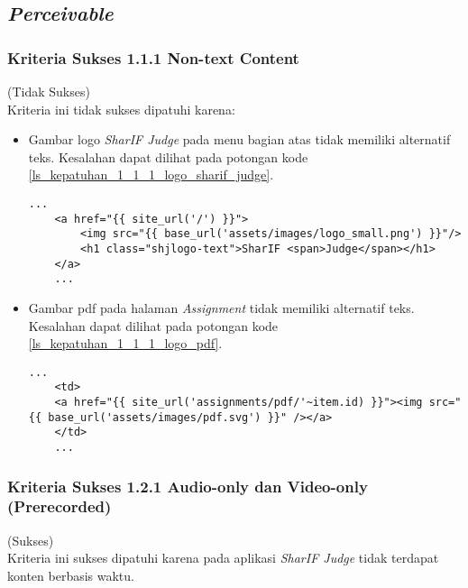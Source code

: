\subsection{\textit{Perceivable}}
\label{subsec:kepatuhan_perceivable}

\subsubsection{Kriteria Sukses 1.1.1 Non-text Content}
\label{subsubsec:kepatuhan_kriteria_1.1.1}
(Tidak Sukses) \\

Kriteria ini tidak sukses dipatuhi karena:
\begin{itemize}
	\item Gambar logo \textit{SharIF Judge} pada menu bagian atas tidak memiliki alternatif teks. Kesalahan dapat dilihat pada potongan kode \ref{ls_kepatuhan_1_1_1_logo_sharif_judge}.
	\begin{lstlisting}[basicstyle=\ttfamily, frame=single,
	columns=fullflexible, keepspaces=true, breaklines=true, label=ls_kepatuhan_1_1_1_logo_sharif_judge, caption=Kriteria Sukses 1.1.1 - Logo SharIF Judge Tidak Diberi Alternatif Teks]
	...
	<a href="{{ site_url('/') }}">
		<img src="{{ base_url('assets/images/logo_small.png') }}"/>
		<h1 class="shjlogo-text">SharIF <span>Judge</span></h1>
	</a>
	...
	\end{lstlisting}
	\item Gambar pdf pada halaman \textit{Assignment} tidak memiliki alternatif teks. Kesalahan dapat dilihat pada potongan kode \ref{ls_kepatuhan_1_1_1_logo_pdf}.
	\begin{lstlisting}[basicstyle=\ttfamily, frame=single,
	columns=fullflexible, keepspaces=true, breaklines=true, label=ls_kepatuhan_1_1_1_logo_pdf, caption=Kriteria Sukses 1.1.1 - Gambar PDF Tidak Diberi Alternatif Teks]
	...
	<td>
	<a href="{{ site_url('assignments/pdf/'~item.id) }}"><img src="{{ base_url('assets/images/pdf.svg') }}" /></a>
	</td>
	...
	\end{lstlisting}
\end{itemize}

\subsubsection{Kriteria Sukses 1.2.1 Audio-only dan Video-only (Prerecorded)}
\label{subsubsec:kepatuhan_kriteria_1.2.1}
(Sukses) \\

Kriteria ini sukses dipatuhi karena pada aplikasi \textit{SharIF Judge} tidak terdapat konten berbasis waktu.

